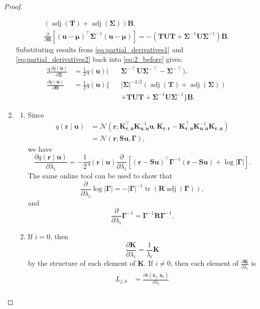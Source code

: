 \documentclass{mpaper}
\DeclareMathOperator{\adj}{adj}
\DeclareMathOperator{\tr}{tr}
\newcommand{\Kuu}{\mathbf{K}_{\mathbf{u},\mathbf{u}}}
\newcommand{\Krr}{\mathbf{K}_{\mathbf{r},\mathbf{r}}}
\newcommand{\Kru}{\mathbf{K}_{\mathbf{r},\mathbf{u}}}
\newcommand{\dB}{\frac{\partial}{\partial\mathbf{B}}}
\newcommand{\dl}{\frac{\partial}{\partial \lambda_i}}
\begin{document}
\begin{proof}
\begin{enumerate}
\begin{equation}
\begin{gathered}
        (\adj(\mathbf{T}) + \adj(\bm\Sigma))\mathbf{B}, \\
        \dB[(\mathbf{u} - \bm\mu)^\intercal\bm\Sigma^{-1}(\mathbf{u} -
        \bm\mu)] = -(\mathbf{TUT} +
        \bm\Sigma^{-1}\mathbf{U}\bm\Sigma^{-1})\mathbf{B}.
      \end{gathered}
    \end{equation}
    Substituting results from \eqref{eq:partial_derivatives1} and
    \eqref{eq:partial_derivatives2} back into \eqref{eq:2_before} gives:
    \begin{alignat*}{3}
      \frac{\partial q(\mathbf{u})}{\partial \bm\Sigma} &=
      \frac{1}{2}q(\mathbf{u})(&&\bm\Sigma^{-\intercal}\mathbf{U}\bm\Sigma^{-\intercal}
      - \bm\Sigma^{-\intercal}), \\
      \frac{\partial q(\mathbf{u})}{\partial \mathbf{B}} &=
      \frac{1}{2}q(\mathbf{u}) \{&&|\bm\Sigma|^{-3/2}(\adj(\mathbf{T}) +
      \adj(\bm\Sigma)) \\
      & &&+ \mathbf{TUT} + \bm\Sigma^{-1}\mathbf{U}\bm\Sigma^{-1} \} \mathbf{B}.
    \end{alignat*}
  \item
    \begin{enumerate}
    \item Since
    \begin{align*}
      q(\mathbf{r} \mid \mathbf{u}) &= \mathcal{N}(\mathbf{r};
      \Kru^\intercal\Kuu^{-1}\mathbf{u}, \Krr - \Kru^\intercal \Kuu^{-1}\Kru) \\
      &= \mathcal{N}(\mathbf{r}; \mathbf{Su}, \bm\Gamma),
    \end{align*}
    we have
    \[
      \frac{\partial q(\mathbf{r} \mid \mathbf{u})}{\partial \lambda_i} =
      -\frac{1}{2}q(\mathbf{r} \mid \mathbf{u}) \dl[(\mathbf{r} -
      \mathbf{Su})^\intercal\bm\Gamma^{-1}(\mathbf{r} - \mathbf{Su}) +
      \log|\bm\Gamma|].
    \]
    The same online tool can be used to show that
    \[
      \dl \log|\bm\Gamma| = -|\bm\Gamma|^{-1}\tr(\mathbf{R}\adj(\bm\Gamma)),
    \]
    and
    \[
      \dl \bm\Gamma^{-1} = \bm\Gamma^{-1}\mathbf{R}\bm\Gamma^{-1}.
    \]
  \item
    If $i=0$, then
    \[
      \frac{\partial \mathbf{K}}{\partial \lambda_i} =
      \frac{1}{\lambda_i}\mathbf{K}
    \]
    by the structure of each element of $\mathbf{K}$. If $i \ne 0$, then each
    element of $\frac{\partial \mathbf{K}}{\partial \lambda_i}$ is
    \begin{align*}
      L_{j,k} &= \frac{\partial k(\mathbf{x}_j, \mathbf{x}_k)}{\partial \lambda_i} \\

\end{align*}
\end{enumerate}
\end{enumerate}
\end{proof}
\end{document}
